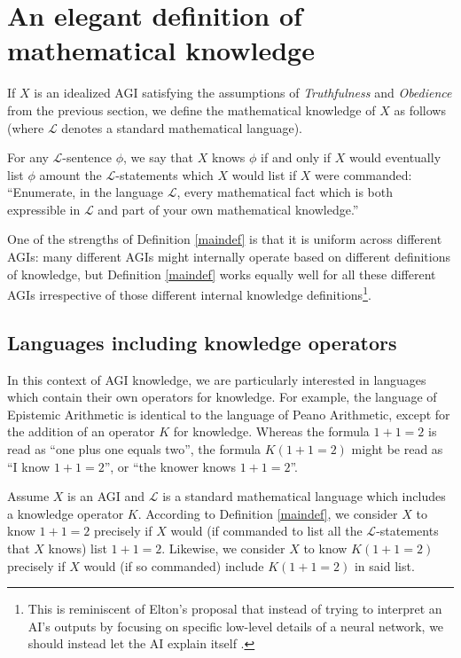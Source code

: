 \documentclass[runningheads]{llncs}
\begin{document}
\section{An elegant definition of mathematical knowledge}

If $X$ is an idealized AGI satisfying the assumptions of \emph{Truthfulness}
and \emph{Obedience} from the previous section, we define the mathematical
knowledge of $X$ as follows (where $\mathscr L$ denotes a standard mathematical
language).

\begin{definition}
\label{maindef}
  For any $\mathscr L$-sentence $\phi$, we say that $X$ knows $\phi$ if and only
  if $X$ would eventually list $\phi$ amount the $\mathscr L$-statements which $X$
  would list if $X$ were commanded:
  ``Enumerate, in the language $\mathscr L$, every mathematical fact which
  is both expressible in $\mathscr L$ and part of your own mathematical knowledge.''
\end{definition}

One of the strengths of Definition \ref{maindef} is that it is uniform across
different AGIs: many different AGIs might internally operate based on different
definitions of knowledge, but Definition \ref{maindef} works equally well for
all these different AGIs irrespective of those different internal knowledge
definitions\footnote{This is reminiscent of Elton's proposal that instead of
trying to interpret an AI's outputs by focusing on specific low-level details
of a neural network, we should instead let the AI explain itself \cite{elton}.}.

\subsection{Languages including knowledge operators}

In this context of AGI knowledge, we are particularly interested in languages
which contain their own operators for knowledge. For example, the language of
Epistemic Arithmetic \cite{shapiro} is identical to the language of Peano
Arithmetic, except for the addition of an operator $K$ for knowledge. Whereas
the formula $1+1=2$ is read as ``one plus one equals two'', the formula
$K(1+1=2)$ might be read as ``I know $1+1=2$'', or ``the knower knows $1+1=2$''.

Assume $X$ is an AGI and $\mathscr L$ is a standard mathematical
language which includes a knowledge operator $K$. According to Definition
\ref{maindef}, we consider $X$ to know $1+1=2$ precisely if $X$ would (if commanded
to list all the $\mathscr L$-statements that $X$ knows) list $1+1=2$.
Likewise, we consider $X$ to know $K(1+1=2)$ precisely if $X$ would (if so commanded)
include $K(1+1=2)$ in said list.
\end{document}
